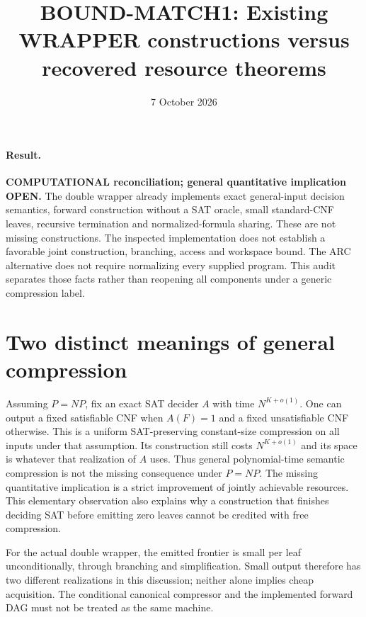 \documentclass[11pt]{article}
\title{BOUND-MATCH1: Existing WRAPPER constructions versus recovered resource theorems}
\date{7 October 2026}
\begin{document}
\maketitle
\paragraph{Result.}
\textbf{COMPUTATIONAL reconciliation; general quantitative implication OPEN.}
The double wrapper already implements exact general-input decision semantics,
forward construction without a SAT oracle, small standard-CNF leaves, recursive
termination and normalized-formula sharing. These are not missing constructions.
The inspected implementation does not establish a favorable joint construction,
branching, access and workspace bound. The ARC alternative does not require
normalizing every supplied program. This audit separates those facts rather
than reopening all components under a generic compression label.

\section*{Two distinct meanings of general compression}
Assuming $P=NP$, fix an exact SAT decider $A$ with time $N^{K+o(1)}$.
One can output a fixed satisfiable CNF when $A(F)=1$ and a fixed unsatisfiable
CNF otherwise. This is a uniform SAT-preserving constant-size compression on
all inputs under that assumption. Its construction still costs
$N^{K+o(1)}$ and its space is whatever that realization of $A$ uses.
Thus general polynomial-time semantic compression is not the missing
consequence under $P=NP$. The missing quantitative implication is a strict
improvement of jointly achievable resources. This elementary observation
also explains why a construction that finishes deciding SAT before emitting
zero leaves cannot be credited with free compression.

For the actual double wrapper, the emitted frontier is small per leaf
unconditionally, through branching and simplification. Small output therefore
has two different realizations in this discussion; neither alone implies cheap
acquisition. The conditional canonical compressor and the implemented forward
DAG must not be treated as the same machine.
\end{document}
